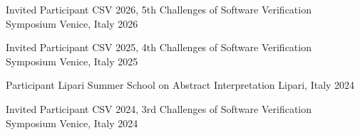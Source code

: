 
\begin{cvhonors}

  \cvhonor
  {Invited Participant}
  {CSV 2026, 5th Challenges of Software Verification Symposium}
  {Venice, Italy} %
  {2026} %

  \cvhonor
  {Invited Participant}
  {CSV 2025, 4th Challenges of Software Verification Symposium}
  {Venice, Italy} %
  {2025} %

  \cvhonor
  {Participant}
  {Lipari Summer School on Abstract Interpretation}
  {Lipari, Italy}
  {2024}

  \cvhonor
  {Invited Participant}
  {CSV 2024, 3rd Challenges of Software Verification Symposium}
  {Venice, Italy} %
  {2024} %

\end{cvhonors}
